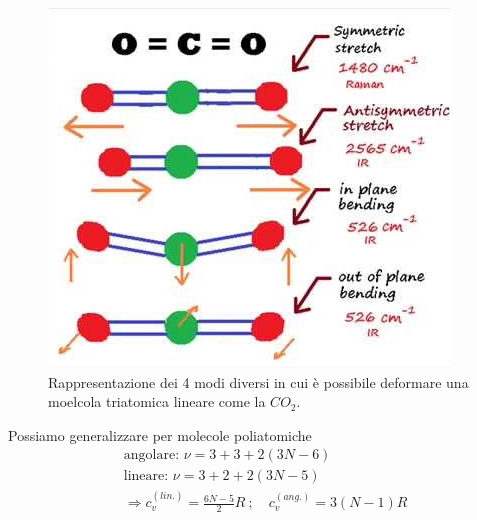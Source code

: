 \documentclass[
10pt, %
a4paper, %
oneside, %
headinclude,footinclude, %
BCOR5mm, %
]{scrartcl}
\begin{document}
\begin{figure}[h!]
	\centering
	\includegraphics[width=0.5\linewidth]{../images/hqdefault}
	\caption{Rappresentazione dei 4 modi diversi in cui è possibile deformare una moelcola triatomica lineare come la \(CO_2\).}
	\label{fig:hqdefault}
\end{figure}
\FloatBarrier
Possiamo generalizzare per molecole poliatomiche
\begin{align*}
	&\text{angolare: } \nu = 3+3+2(3N-6)\\
	&\text{lineare: } \nu = 3+2+2(3N-5)\\
	&\Rightarrow c_v^{(lin.)} = \frac{6N-5}{2}R\ ;\quad c_v^{(ang.)}=3(N-1)R	
\end{align*}
\end{document}
